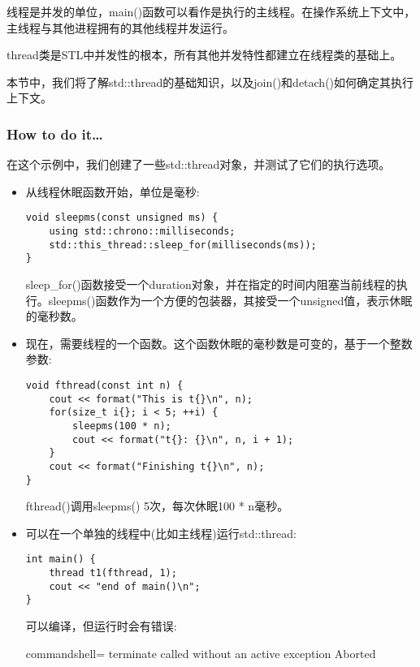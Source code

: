
线程是并发的单位，main()函数可以看作是执行的主线程。在操作系统上下文中，主线程与其他进程拥有的其他线程并发运行。

thread类是STL中并发性的根本，所有其他并发特性都建立在线程类的基础上。

本节中，我们将了解std::thread的基础知识，以及join()和detach()如何确定其执行上下文。

\subsubsection{How to do it…}

在这个示例中，我们创建了一些std::thread对象，并测试了它们的执行选项。

\begin{itemize}
\item 
从线程休眠函数开始，单位是毫秒:

\begin{lstlisting}[style=styleCXX]
void sleepms(const unsigned ms) {
	using std::chrono::milliseconds;
	std::this_thread::sleep_for(milliseconds(ms));
}
\end{lstlisting}

sleep\_for()函数接受一个duration对象，并在指定的时间内阻塞当前线程的执行。sleepms()函数作为一个方便的包装器，其接受一个unsigned值，表示休眠的毫秒数。

\item 
现在，需要线程的一个函数。这个函数休眠的毫秒数是可变的，基于一个整数参数:

\begin{lstlisting}[style=styleCXX]
void fthread(const int n) {
	cout << format("This is t{}\n", n);
	for(size_t i{}; i < 5; ++i) {
		sleepms(100 * n);
		cout << format("t{}: {}\n", n, i + 1);
	}
	cout << format("Finishing t{}\n", n);
}
\end{lstlisting}

fthread()调用sleepms() 5次，每次休眠100 * n毫秒。

\item 
可以在一个单独的线程中(比如主线程)运行std::thread:

\begin{lstlisting}[style=styleCXX]
int main() {
	thread t1(fthread, 1);
	cout << "end of main()\n";
}
\end{lstlisting}

可以编译，但运行时会有错误:

\begin{tcblisting}{commandshell={}}
terminate called without an active exception Aborted
\end{tcblisting}


\end{itemize}
